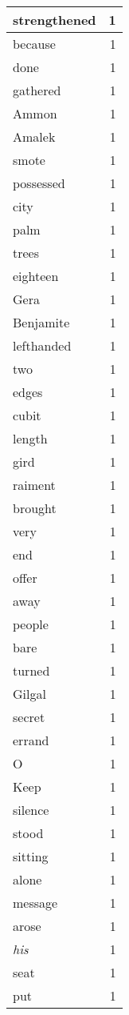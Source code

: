 \begin{center}
\begin{longtable}{l|r}
strengthened & 1 \\ \hline
because & 1 \\ \hline
done & 1 \\ \hline
gathered & 1 \\ \hline
Ammon & 1 \\ \hline
Amalek & 1 \\ \hline
smote & 1 \\ \hline
possessed & 1 \\ \hline
city & 1 \\ \hline
palm & 1 \\ \hline
trees & 1 \\ \hline
eighteen & 1 \\ \hline
Gera & 1 \\ \hline
Benjamite & 1 \\ \hline
lefthanded & 1 \\ \hline
two & 1 \\ \hline
edges & 1 \\ \hline
cubit & 1 \\ \hline
length & 1 \\ \hline
gird & 1 \\ \hline
raiment & 1 \\ \hline
brought & 1 \\ \hline
very & 1 \\ \hline
end & 1 \\ \hline
offer & 1 \\ \hline
away & 1 \\ \hline
people & 1 \\ \hline
bare & 1 \\ \hline
turned & 1 \\ \hline
Gilgal & 1 \\ \hline
secret & 1 \\ \hline
errand & 1 \\ \hline
O & 1 \\ \hline
Keep & 1 \\ \hline
silence & 1 \\ \hline
stood & 1 \\ \hline
sitting & 1 \\ \hline
alone & 1 \\ \hline
message & 1 \\ \hline
arose & 1 \\ \hline
\emph{his} & 1 \\ \hline
seat & 1 \\ \hline
put & 1 \\ \hline

\end{longtable}
\end{center}
